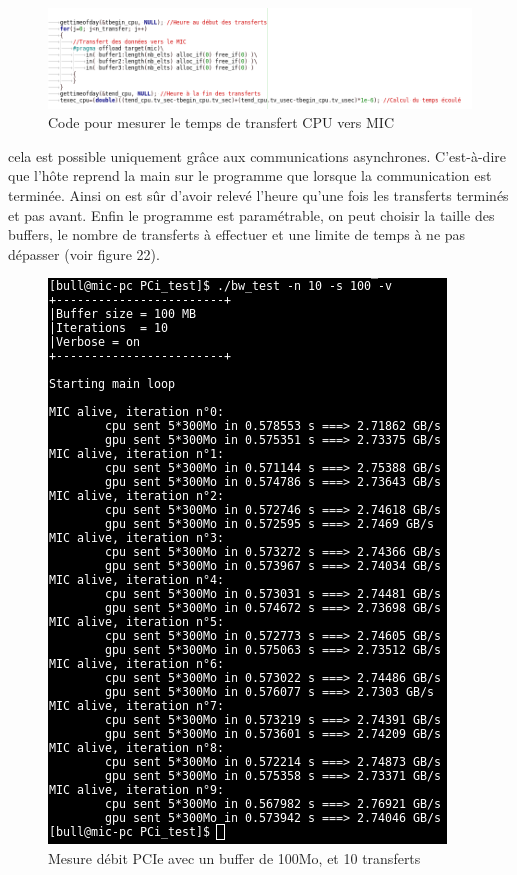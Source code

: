 \documentclass{article}
\begin{document}
					\begin{figure}
					\begin{center}
					\includegraphics[scale=0.5]{code.png}
					\caption{Code pour mesurer le temps de transfert CPU vers MIC}
					\end{center}
					\end{figure}
					cela est possible uniquement grâce aux communications asynchrones. C'est-à-dire que l'hôte reprend la main 
					sur le programme que lorsque la communication est terminée. Ainsi on est sûr d'avoir relevé l'heure qu'une 
					fois les transferts terminés et pas avant. Enfin le programme est paramétrable, on peut choisir la taille 
					des buffers, le nombre de transferts à effectuer et une limite de temps à ne pas dépasser (voir figure 22).
					\begin{figure}
					\begin{center}
					\includegraphics[scale=0.4]{bwtest.png}
					\caption{Mesure débit PCIe avec un buffer de 100Mo, et 10 transferts}
					\end{center}
					\end{figure}
\end{document}
